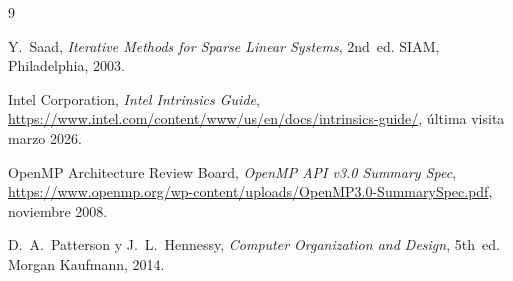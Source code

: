 \documentclass[a4paper,twocolumn]{article}
\begin{document}
\begin{thebibliography}{9}

  Y.~Saad,
  \textit{Iterative Methods for Sparse Linear Systems}, 2nd~ed.
  SIAM, Philadelphia, 2003.

  Intel Corporation,
  \textit{Intel Intrinsics Guide},
  \url{https://www.intel.com/content/www/us/en/docs/intrinsics-guide/},
  \newblock [online] última visita marzo 2026.

  OpenMP Architecture Review Board,
  \textit{OpenMP API v3.0 Summary Spec},
  \url{https://www.openmp.org/wp-content/uploads/OpenMP3.0-SummarySpec.pdf},
  noviembre 2008.

  D.~A.~Patterson y J.~L.~Hennessy,
  \textit{Computer Organization and Design}, 5th~ed.
  Morgan Kaufmann, 2014.

\end{thebibliography}
\end{document}
